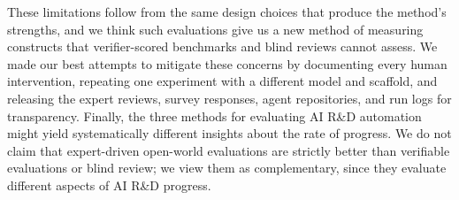 These limitations follow from the same design choices that produce the
method's strengths, and we think such evaluations give us a new method of
measuring constructs that verifier-scored benchmarks and blind reviews cannot
assess. We made our best attempts to mitigate these concerns by documenting
every human intervention, repeating one experiment with a different model and
scaffold, and releasing the expert reviews, survey responses, agent
repositories, and run logs for transparency. Finally, the three methods for
evaluating AI R\&D automation might yield systematically different insights
about the rate of progress. We do not claim that expert-driven open-world
evaluations are strictly better than verifiable evaluations or blind review;
we view them as complementary, since they evaluate different aspects of AI
R\&D progress.




